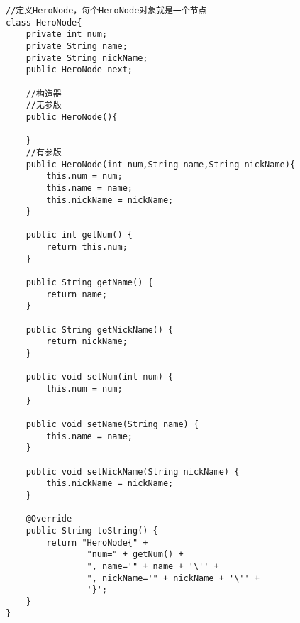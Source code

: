 \documentclass[a4paper]{report}
\begin{document}
\begin{lstlisting}
//定义HeroNode，每个HeroNode对象就是一个节点
class HeroNode{
    private int num;
    private String name;
    private String nickName;
    public HeroNode next;

    //构造器
    //无参版
    public HeroNode(){

    }
    //有参版
    public HeroNode(int num,String name,String nickName){
        this.num = num;
        this.name = name;
        this.nickName = nickName;
    }

    public int getNum() {
        return this.num;
    }

    public String getName() {
        return name;
    }

    public String getNickName() {
        return nickName;
    }

    public void setNum(int num) {
        this.num = num;
    }

    public void setName(String name) {
        this.name = name;
    }

    public void setNickName(String nickName) {
        this.nickName = nickName;
    }

    @Override
    public String toString() {
        return "HeroNode{" +
                "num=" + getNum() +
                ", name='" + name + '\'' +
                ", nickName='" + nickName + '\'' +
                '}';
    }
}
\end{lstlisting}
\end{document}
